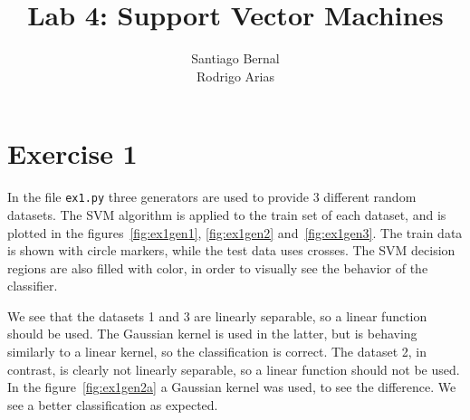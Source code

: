 \documentclass[a4paper]{article}
\title{Lab 4: Support Vector Machines}
\author{Santiago Bernal \\ Rodrigo Arias}
\begin{document}
\maketitle

\section{Exercise 1}
%
%
In the file \texttt{ex1.py} three generators are used to provide 3 different 
random datasets.
%
%
The SVM algorithm is applied to the train set of each dataset, and is plotted in 
the figures~\ref{fig:ex1gen1}, \ref{fig:ex1gen2} and~\ref{fig:ex1gen3}.
%
%
The train data is shown with circle markers, while the test data uses crosses.  
The SVM decision regions are also filled with color, in order to visually see 
the behavior of the classifier.
%
%

We see that the datasets 1 and 3 are linearly separable, so a linear function 
should be used. The Gaussian kernel is used in the latter, but is behaving 
similarly to a linear kernel, so the classification is correct. The dataset 2, 
in contrast, is clearly not linearly separable, so a linear function should not 
be used. In the figure~\ref{fig:ex1gen2a} a Gaussian kernel was used, to see the 
difference. We see a better classification as expected.
\end{document}
